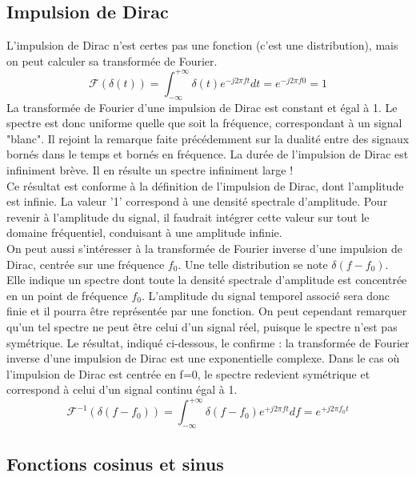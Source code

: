 	
	
	\subsection{Impulsion de Dirac}
	L'impulsion de Dirac n'est certes pas une fonction (c'est une distribution), mais on peut calculer sa transformée de Fourier. 
	\begin{equation}\label{key}
	\mathcal{F}(\delta(t))=\int_{-\infty}^{+\infty}\delta(t) e^{-j2\pi ft}dt = e^{-j2\pi f0}=1
	\end{equation}
	La transformée de Fourier d'une impulsion de Dirac est constant et égal à 1. Le spectre est donc uniforme quelle que soit la fréquence, correspondant à un signal "blanc". Il rejoint la remarque faite précédemment sur la dualité entre des signaux bornés dans le temps et bornés en fréquence. La durée de l'impulsion de Dirac est infiniment brève. Il en résulte un spectre infiniment large !\\
	Ce résultat est conforme à la définition de l'impulsion de Dirac, dont l'amplitude est infinie. La valeur '1' correspond à une densité spectrale d'amplitude. Pour revenir à l'amplitude du signal, il faudrait intégrer cette valeur sur tout le domaine fréquentiel, conduisant à une amplitude infinie.\\
	
	On peut aussi s'intéresser à la transformée de Fourier inverse d'une impulsion de Dirac, centrée sur une fréquence $f_0$. Une telle distribution se note $\delta(f-f_0)$. Elle indique un spectre dont toute la densité spectrale d'amplitude est concentrée en un point de fréquence $f_0$. L'amplitude du signal temporel associé sera donc finie et il pourra être représentée par une fonction. On peut cependant remarquer qu'un tel spectre ne peut être celui d'un signal réel, puisque le spectre n'est pas symétrique. Le résultat, indiqué ci-dessous, le confirme : la transformée de Fourier inverse d'une impulsion de Dirac est une exponentielle complexe. Dans le cas où l'impulsion de Dirac est centrée en f=0, le spectre redevient symétrique et correspond à celui d'un signal continu égal à 1.
	\begin{equation}\label{key}
	\mathcal{F}^{-1}(\delta(f-f_0))=\int_{-\infty}^{+\infty}\delta(f-f_0) e^{+j2\pi ft}df=e^{+j2\pi f_0 t}
	\end{equation}
	
	
	
	
	\subsection{Fonctions cosinus et sinus}
	
